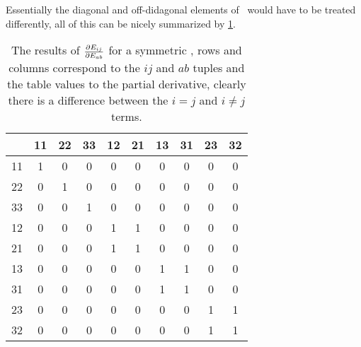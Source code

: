 \documentclass[11pt]{article}
\begin{document}
Essentially the diagonal and off-didagonal elements of \EE\ would have to be treated differently, all of this can be nicely summarized by \cref{tab:devtable}.
\begin{table}[H]
    \begin{center}
        \begin{tabular}{ c|c c c c c c c c c } 
               & 11 & 22 & 33 & 12 & 21 & 13 & 31 & 23 & 32 \\
            \hline
            11 & 1  &  0 &  0 &  0 &  0 &  0 &  0 &  0 &  0 \\
            22 & 0  &  1 &  0 &  0 &  0 &  0 &  0 &  0 &  0 \\
            33 & 0  &  0 &  1 &  0 &  0 &  0 &  0 &  0 &  0 \\
            12 & 0  &  0 &  0 &  1 &  1 &  0 &  0 &  0 &  0 \\
            21 & 0  &  0 &  0 &  1 &  1 &  0 &  0 &  0 &  0 \\
            13 & 0  &  0 &  0 &  0 &  0 &  1 &  1 &  0 &  0 \\
            31 & 0  &  0 &  0 &  0 &  0 &  1 &  1 &  0 &  0 \\
            23 & 0  &  0 &  0 &  0 &  0 &  0 &  0 &  1 &  1 \\
            32 & 0  &  0 &  0 &  0 &  0 &  0 &  0 &  1 &  1
        \end{tabular}
    \end{center}
    \caption{The results of $\pdv{E_{ij}}{E_{ab}}$ for a symmetric \EE, rows and columns correspond to the $ij$ and $ab$ tuples and the table values to the partial derivative, clearly there is a difference between the $i=j$ and $i\neq j$ terms.}\label{tab:devtable}
\end{table}

\end{document}
